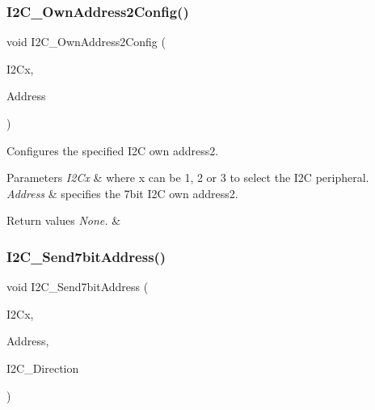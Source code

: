 \subsubsection{\texorpdfstring{I2\+C\+\_\+\+Own\+Address2\+Config()}{I2C\_OwnAddress2Config()}}
{\footnotesize\ttfamily void I2\+C\+\_\+\+Own\+Address2\+Config (\begin{DoxyParamCaption}\item[{I2\+C\+\_\+\+Type\+Def $\ast$}]{I2\+Cx,  }\item[{uint8\+\_\+t}]{Address }\end{DoxyParamCaption})}



Configures the specified I2C own address2. 


\begin{DoxyParams}{Parameters}
{\em I2\+Cx} & where x can be 1, 2 or 3 to select the I2C peripheral. \\
\hline
{\em Address} & specifies the 7bit I2C own address2. \\
\hline
\end{DoxyParams}

\begin{DoxyRetVals}{Return values}
{\em None.} & \\
\hline
\end{DoxyRetVals}
\mbox{\label{group___i2_c___group1_ga009fc2a5b2313c36da39ece39a1156a6}} 
\subsubsection{\texorpdfstring{I2\+C\+\_\+\+Send7bit\+Address()}{I2C\_Send7bitAddress()}}
{\footnotesize\ttfamily void I2\+C\+\_\+\+Send7bit\+Address (\begin{DoxyParamCaption}\item[{I2\+C\+\_\+\+Type\+Def $\ast$}]{I2\+Cx,  }\item[{uint8\+\_\+t}]{Address,  }\item[{uint8\+\_\+t}]{I2\+C\+\_\+\+Direction }\end{DoxyParamCaption})}



